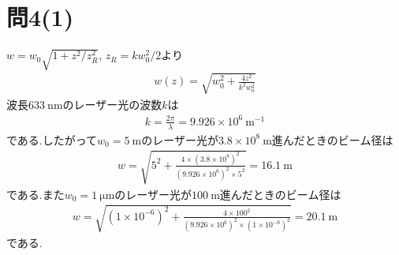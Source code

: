 \documentclass[uplatex,a4j,11pt,dvipdfmx]{jsarticle}
\numberwithin{equation}{section}
\begin{document}
\section*{問4(1)}
$w=w_0\sqrt{1+z^2/z_R^2}$, $z_R=kw_0^2/2$より
\begin{align}
  w(z)=\sqrt{w_0^2+\frac{4z^2}{k^2w_0^2}}
\end{align}
波長$633\ \si{\nano\metre}$のレーザー光の波数$k$は
\begin{align}
  k=\frac{2\pi}{\lambda}=9.926\times10^6\ \si{\metre^{-1}}
\end{align}
である.したがって$w_0=5\ \si{\metre}$のレーザー光が$3.8\times10^8\ \si{\metre}$進んだときのビーム径は
\begin{align}
  w=\sqrt{5^2+\frac{4\times(3.8\times10^8)^2}{(9.926\times10^6)^2\times5^2}}=16.1\ \si{\metre}
\end{align}
である.また$w_0=1\ \si{\micro\metre}$のレーザー光が$100\ \si{\metre}$進んだときのビーム径は
\begin{align}
  w=\sqrt{(1\times10^{-6})^2+\frac{4\times100^2}{(9.926\times10^6)^2\times(1\times10^{-6})^2}}=20.1\ \si{\metre}
\end{align}
である.
\end{document}
